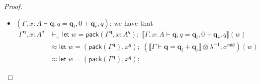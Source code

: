 \documentclass[acmsmall,screen,anonymous,review]{acmart}
\newcommand{\mb}[1]{\ensuremath{\mathbf{#1}}}
\newcommand{\ms}[1]{\ensuremath{\mathsf{#1}}}
\newcommand{\letexpr}[3]{\ensuremath{\ms{let}\;#1 = #2;\;#3}}
\newcommand{\qsp}[4]{#1 \vdash #2 = #3 + #4}
\newcommand{\dnt}[1]{\llbracket{#1}\rrbracket}
\begin{document}
\begin{proof}
\begin{itemize}
\begin{align*}
        &\approx
        \letexpr{w}{(\ms{pack}(\Gamma^{\mb{q}}), x^q)}{
          (\dnt{\qsp{\Gamma}{\mb{q}}{\mb{q}_l}{\mb{q}_r}} \otimes \rho^{-1} ; \sigma^{\ms{mid}})(w)
        } \\
        &\approx
        \letexpr{w}{(\ms{pack}(\Gamma^{\mb{q}}), x^q)}{
          ((\lambda (y, z) . (\dnt{\qsp{\Gamma}{\mb{q}}{\mb{q}_l}{\mb{q}_r}}(y), (z, ()))) 
            ; \sigma^{\ms{mid}})(w)
        } \\
        &\approx
        \letexpr{y}{\ms{pack}(\Gamma^{\mb{q}})}{
          \letexpr{z}{x^q}{
            \letexpr{u}{(\dnt{\qsp{\Gamma}{\mb{q}}{\mb{q}_l}{\mb{q}_r}}(y), (z, ()))}
              {\sigma^{\ms{mid}}(u)}
          }
        }
        \\
        &\approx
        \letexpr{y}{\ms{pack}(\Gamma^{\mb{q}})}{
          \letexpr{u}{(\dnt{\qsp{\Gamma}{\mb{q}}{\mb{q}_l}{\mb{q}_r}}(y), (x^q, ()))}
            {\sigma^{\ms{mid}}(u)}
        }
        \\
        &\approx
        \letexpr{u}{
          ((\letexpr{y}{\ms{pack}(\Gamma^{\mb{q}})}
            {(\dnt{\qsp{\Gamma}{\mb{q}}{\mb{q}_l}{\mb{q}_r}}(y)}), (x^q, ()))
          }
          {\sigma^{\ms{mid}}(u)}
        \\
        &\approx
        \letexpr{((u_1, u_2), (u_3, u_4)}{
          ((\ms{pack}(\Gamma^{\mb{q}_l}), \ms{pack}(\Gamma^{\mb{q}_r})), (x^q, ()))
          }
          {((u_1, u_3), (u_2, u_4))}
        \\
        &\approx
          (\ms{pack}(\Gamma^{\mb{q}_l}), x^q), (\ms{pack}(\Gamma^{\mb{q}_r}), ()))
        \\
        &\approx
          (\ms{pack}(\Gamma^{\mb{q}_l}, x : A^q), \ms{pack}(\Gamma^{\mb{q}_r}, x : A^0))
        : [\Gamma^{\mb{q}_l}, x : A^q] \otimes [\Gamma^{\mb{q}_r}, x : A^0]
    \end{align*}
    as desired.
    \item $(\qsp{\Gamma, x : A}{\mb{q}, q}{\mb{q}_l, 0}{\mb{q}_r, q})$: we have that
    \begin{align*}
      \Gamma^{\mb{q}}, x : A^q &\vdash_\bot
        \letexpr{w}{\ms{pack}(\Gamma^{\mb{q}}, x : A^q)}
          {\dnt{\qsp{\Gamma, x : A}{\mb{q}, q}{\mb{q}_l, 0}{\mb{q}_r, q}}(w)} \\
        &\approx
        \letexpr{w}{(\ms{pack}(\Gamma^{\mb{q}}), x^q)}{
          (\dnt{\qsp{\Gamma}{\mb{q}}{\mb{q}_l}{\mb{q}_r}} \otimes \lambda^{-1} 
            ; \sigma^{\ms{mid}})(w)
        } \\
        &\approx
        \letexpr{w}{(\ms{pack}(\Gamma^{\mb{q}}), x^q)}{
}
\end{align*}
\end{itemize}
\end{proof}
\end{document}
